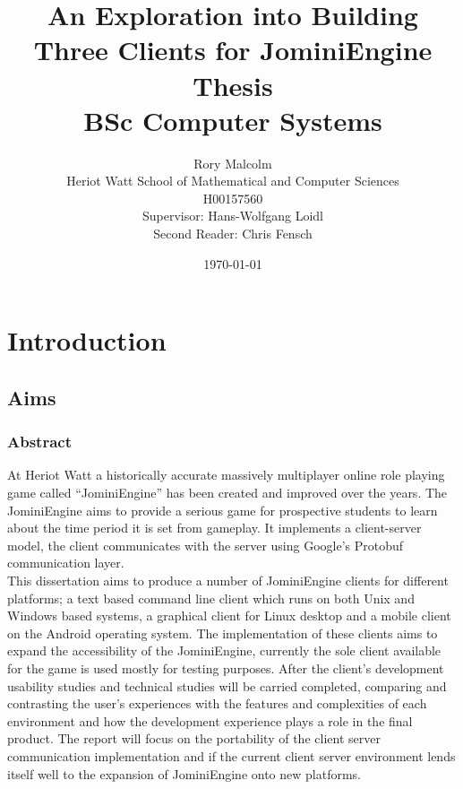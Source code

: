\documentclass{article}
\title{An Exploration into Building Three Clients for JominiEngine\\ Thesis \\BSc Computer Systems}
\author{Rory Malcolm\\Heriot Watt School of Mathematical and Computer Sciences\\H00157560\\Supervisor: Hans-Wolfgang Loidl\\Second Reader: Chris Fensch}
\date{\today}
\begin{document}
	\maketitle
	\newpage
	\tableofcontents
	\newpage
	\section{Introduction}
	\subsection{Aims}
	\subsubsection{Abstract}
	At Heriot Watt a historically accurate massively multiplayer online role playing game called “JominiEngine” has been created and improved over the years. The JominiEngine aims to provide a serious game for prospective students to learn about the time period it is set from gameplay. It implements a client-server model, the client communicates with the server using Google's Protobuf communication layer.\\

	This dissertation aims to produce a number of JominiEngine clients for different platforms; a text based command line client which runs on both Unix and Windows based systems, a graphical client for Linux desktop and a mobile client on the Android operating system. The implementation of these clients aims to expand the accessibility of the JominiEngine, currently the sole client available for the game is used mostly for testing purposes. After the client's development usability studies and technical studies will be carried completed, comparing and contrasting the user’s experiences with the features and complexities of each environment and how the development experience plays a role in the final product. The report will focus on the portability of the client server communication implementation and if the current client server environment lends itself well to the expansion of JominiEngine onto new platforms.
\end{document}
